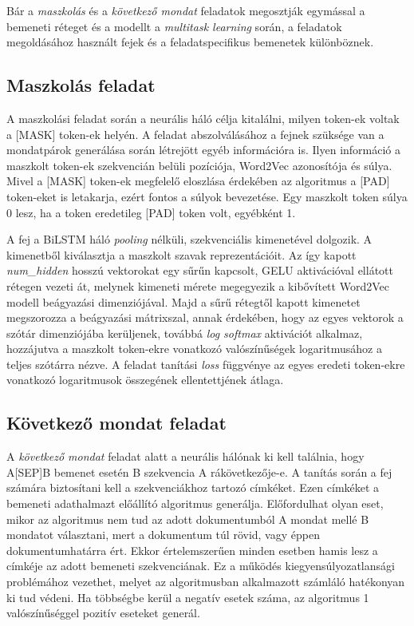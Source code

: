 Bár a \textit{maszkolás} és a \textit{következő mondat} feladatok megosztják egymással a bemeneti réteget és a modellt a \textit{multitask learning} során, a feladatok megoldásához használt fejek és a feladatspecifikus bemenetek különböznek.

\subsection{Maszkolás feladat}

A maszkolási feladat során a neurális háló célja kitalálni, milyen token-ek voltak a [MASK] token-ek helyén. A feladat abszolválásához a fejnek szüksége van a mondatpárok generálása során létrejött egyéb információra is. Ilyen információ a maszkolt token-ek szekvencián belüli pozíciója, Word2Vec azonosítója és súlya. Mivel a [MASK] token-ek megfelelő eloszlása érdekében az algoritmus a [PAD] token-eket is letakarja, ezért fontos a súlyok bevezetése. Egy maszkolt token súlya 0 lesz, ha a token eredetileg [PAD] token volt, egyébként 1. 

A fej a BiLSTM háló \textit{pooling} nélküli, szekvenciális kimenetével dolgozik. A kimenetből kiválasztja a maszkolt szavak reprezentációit. Az így kapott \textit{num\_hidden} hosszú vektorokat egy sűrűn kapcsolt, GELU aktivációval \cite{gelu} ellátott rétegen vezeti át, melynek kimeneti mérete megegyezik a kibővített Word2Vec modell beágyazási dimenziójával. Majd a sűrű rétegtől kapott kimenetet megszorozza a beágyazási mátrixszal, annak érdekében, hogy az egyes vektorok a szótár dimenziójába kerüljenek, továbbá \textit{log softmax} aktivációt alkalmaz, hozzájutva a maszkolt token-ekre vonatkozó valószínűségek logaritmusához a teljes szótárra nézve. A feladat tanítási \textit{loss} függvénye az egyes eredeti token-ekre vonatkozó logaritmusok összegének ellentettjének átlaga.


\subsection{Következő mondat feladat}

A \textit{következő mondat} feladat alatt a neurális hálónak ki kell találnia, hogy A[SEP]B bemenet esetén B szekvencia A rákövetkezője-e. A tanítás során a fej számára biztosítani kell a szekvenciákhoz tartozó címkéket. Ezen címkéket a bemeneti adathalmazt előállító algoritmus generálja. Előfordulhat olyan eset, mikor az algoritmus nem tud az adott dokumentumból A mondat mellé B mondatot választani, mert a dokumentum túl rövid, vagy éppen dokumentumhatárra ért. Ekkor értelemszerűen minden esetben hamis lesz a címkéje az adott bemeneti szekvenciának. Ez a működés kiegyensúlyozatlansági problémához vezethet, melyet az algoritmusban alkalmazott számláló hatékonyan ki tud védeni. Ha többségbe kerül a negatív esetek száma, az algoritmus 1 valószínűséggel pozitív eseteket generál. 


